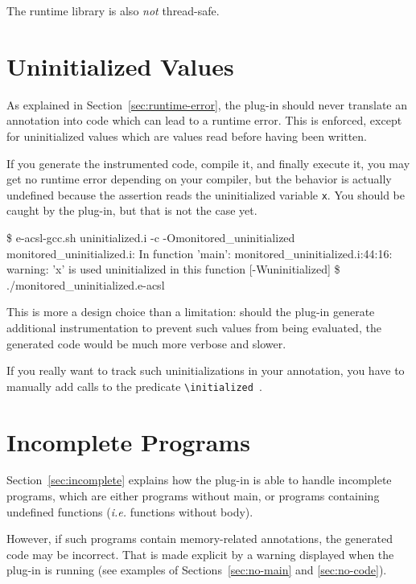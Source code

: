 \begin{important}
The runtime library is also \emph{not} thread-safe.
\end{important}

\section{Uninitialized Values}

As explained in Section~\ref{sec:runtime-error}, the \eacsl plug-in should never
translate an annotation into \C code which can lead to a runtime error. This is
enforced, except for uninitialized values which are values read before having
been written.


If you generate the instrumented code, compile it, and finally execute it, you
may get no runtime error depending on your \C compiler, but the behavior is
actually undefined because the assertion reads the uninitialized variable
\lstinline|x|. You should be caught by the \eacsl plug-in, but that is not
the case yet.

\begin{shell}
\$ e-acsl-gcc.sh uninitialized.i -c -Omonitored_uninitialized
monitored_uninitialized.i: In function 'main':
monitored_uninitialized.i:44:16: warning: 'x' is used uninitialized in this function
[-Wuninitialized]
\$ ./monitored_uninitialized.e-acsl
\end{shell}

This is more a design choice than a limitation: should the \eacsl plug-in
generate additional instrumentation to prevent such values from being evaluated,
the generated code would be much more verbose and slower.

If you really want to track such uninitializations in your annotation, you have
to manually add calls to the \eacsl predicate
\lstinline|\initialized|~\cite{eacsl}.

\section{Incomplete Programs}

Section~\ref{sec:incomplete} explains how the \eacsl plug-in is able to handle
incomplete programs, which are either programs without main, or programs
containing undefined functions (\emph{i.e.} functions without body).

However, if such programs contain memory-related annotations, the generated code
may be incorrect. That is made explicit by a warning displayed when the \eacsl
plug-in is running (see examples of Sections~\ref{sec:no-main} and
\ref{sec:no-code}).

